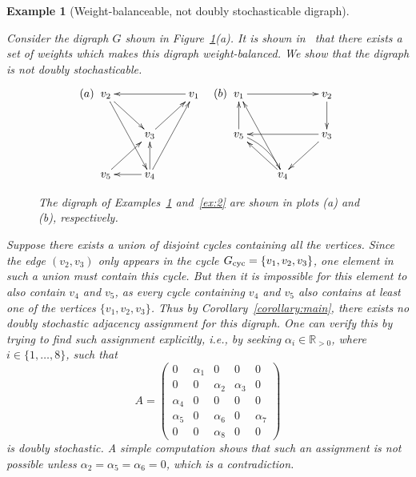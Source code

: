 \documentclass[final]{siamltex}
\newtheorem{example}[theorem]{Example}
\begin{document}
\begin{example}[Weight-balanceable, not doubly stochasticable
    digraph]\label{ex:1} {\rm Consider the digraph $ G $ shown in
    Figure~\ref{fig:ex1}(a). It is shown in~\cite{BG-JC:09-allerton}
    that there exists a set of weights which makes this digraph
    weight-balanced.  We show that the digraph is not doubly
    stochasticable.
    
    \begin{figure}
      \[(a) \;
      \xymatrix{ v_2 \ar[dr] \ar[ddr] & & v_1 \ar[ll] \\
        & v_3 \ar[ur] &\\
        v_5 \ar[ur] & v_4 \ar[u] \ar[uur] \ar[l] & }\quad (b) \;
      \xymatrix{ v_1 \ar[rr] & & v_2 \ar[d] \\
      v_5 \ar[u] \ar@/^/[dr] & &v_3 \ar[ll] \ar[dl]\\
      & v_4 \ar[ul] \ar[uul]& }
    \]
    \caption{The digraph of Examples~\ref{ex:1} and~\ref{ex:2} are
      shown in plots (a) and (b), respectively.}
      \label{fig:ex1}
    \end{figure}
    
    Suppose there exists a union of disjoint cycles containing all the
    vertices.  Since the edge $ (v_2,v_3) $ only appears in the cycle
    $ {{G}_{\textup{{cyc}}}}=\{v_1,v_2,v_3\} $, one element in such a union
    must contain this cycle. But then it is impossible for this
    element to also contain $ v_4 $ and $ v_5 $, as every cycle
    containing $ v_4 $ and $ v_5 $ also contains at least one of the
    vertices $ \{v_1,v_2,v_3\} $.  Thus by
    Corollary~\ref{corollary:main}, there exists no doubly stochastic
    adjacency assignment for this digraph. One can verify this by
    trying to find such assignment explicitly, i.e., by seeking $
    \alpha_i \in \mathbb{R}_{>0} $, where $ i\in\{1,\ldots,8\} $, such
    that
    \[
    A=\left(\begin{array}{ccccc}0 & \alpha_1 & 0 &0 & 0\\
        0 & 0 & \alpha_2 & \alpha_3 & 0\\
        \alpha_4 & 0 &0 &0 &0\\
        \alpha_5 &0 & \alpha_6 & 0 & \alpha_7\\
        0& 0 &\alpha_8 & 0 & 0
      \end{array}\right)
    \]
    is doubly stochastic. A simple computation shows that such an
    assignment is not possible unless $ \alpha_2=\alpha_5=\alpha_6=0$,
    which is a contradiction.  {\relax\ifmmode\else\unskip\hfill\fi{\hbox{$\bullet$}}}}
\end{example}
\end{document}
